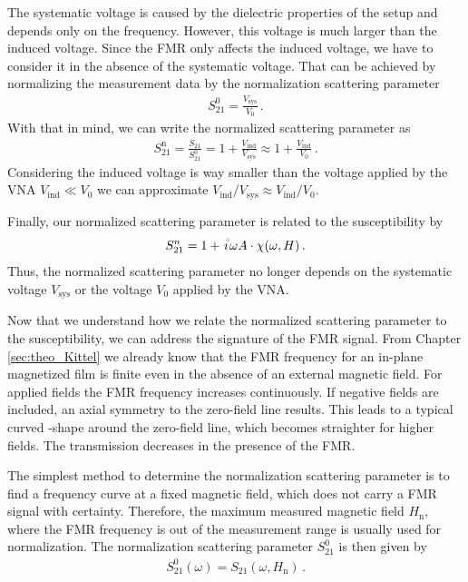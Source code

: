 The systematic voltage is caused by the dielectric properties of the setup and depends only on the frequency. However, this voltage is much larger than the induced voltage. Since the FMR only affects the induced voltage, we have to consider it in the absence of the systematic voltage. That can be achieved by normalizing the measurement data by the normalization scattering parameter
\begin{align}
    S_{21}^0=\frac{V_\text{sys}}{V_0}\,.
\end{align}
With that in mind, we can write the normalized scattering parameter as
\begin{align}
    S_{21}^\text{n}=\frac{S_{21}}{S_{21}^0}=1+\frac{V_\text{ind}}{V_\text{sys}}\approx 1+\frac{V_\text{ind}}{V_0}\,.
\end{align}
Considering the induced voltage is way smaller than the voltage applied by the VNA $V_\text{ind}\ll V_0$ we can approximate $V_\text{ind}/V_\text{sys}\approx V_\text{ind}/V_0$.

Finally, our normalized scattering parameter is related to the susceptibility by
\begin{align}
    S_{21}^n=1+\ima\omega A\cdot \chi(\omega,H)\,.
\end{align}
Thus, the normalized scattering parameter no longer depends on the systematic voltage $V_\text{sys}$ or the voltage $V_0$ applied by the VNA. \cite{Louis2016}

Now that we understand how we relate the normalized scattering parameter to the susceptibility, we can address the signature of the FMR signal. From Chapter \ref{sec:theo_Kittel} we already know that the FMR frequency for an in-plane magnetized film is finite even in the absence of an external magnetic field. For applied fields the FMR frequency increases continuously. If negative fields are included, an axial symmetry to the zero-field line results. This leads to a typical curved -shape around the zero-field line, which becomes straighter for higher fields. The transmission decreases in the presence of the FMR.

The simplest method to determine the normalization scattering parameter is to find a frequency curve at a fixed magnetic field, which does not carry a FMR signal with certainty. Therefore, the maximum measured magnetic field $H_\text{n}$, where the FMR frequency is out of the measurement range is usually used for normalization. The normalization scattering parameter $S_{21}^0$ is then given by
\begin{align}
    S_{21}^0(\omega)=S_{21}(\omega, H_\text{n})\,.
\end{align}


